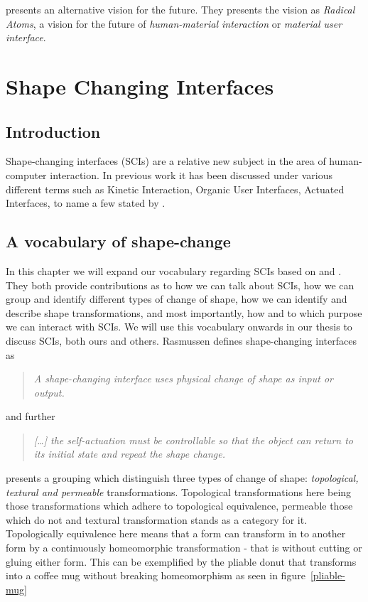 \cite{ishii2012radical} presents an alternative vision for the future.
They presents the vision as \textit{Radical Atoms}, a vision for the future of \textit{human-material interaction} or \textit{material user interface}. 


\section{Shape Changing Interfaces}
\subsection{Introduction}
Shape-changing interfaces (SCIs) are a relative new subject in the area of human-computer interaction.
In previous work it has been discussed under various different terms such as Kinetic Interaction, Organic User Interfaces, Actuated Interfaces, to name a few stated by \cite{rasmussen2012shape}.

\subsection{A vocabulary of shape-change}
In this chapter we will expand our vocabulary regarding SCIs based on \cite{coelho2011shape} and \cite{rasmussen2012shape}.
They both provide contributions as to how we can talk about SCIs, how we can group and identify different types of change of shape, how we can identify and describe shape transformations, and most importantly, how and to which purpose we can interact with SCIs.
We will use this vocabulary onwards in our thesis to discuss SCIs, both ours and others.   
Rasmussen defines shape-changing interfaces as
\begin{quotation}
\emph{A shape-changing interface uses physical change of shape as input or output.}
\end{quotation}
and further
\begin{quotation}
\emph{[\ldots] the self-actuation must be controllable so that the object can return to its initial state and repeat the shape change.}
\end{quotation}

\cite{coelho2011shape} presents a grouping which distinguish three types of change of shape: \emph{topological, textural and permeable} transformations.
Topological transformations here being those transformations which adhere to topological equivalence, permeable those which do not and textural transformation stands as a category for it. Topologically equivalence here means that a form can transform in to another form by a continuously homeomorphic transformation - that is without cutting or gluing either form. This can be exemplified by the pliable donut that transforms into a coffee mug without breaking homeomorphism as seen in figure~\ref{pliable-mug}  

